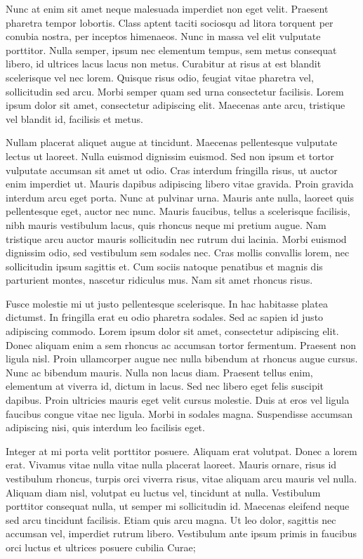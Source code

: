 Nunc at enim sit amet neque malesuada imperdiet non eget velit. Praesent
pharetra tempor lobortis. Class aptent taciti sociosqu ad litora torquent
per conubia nostra, per inceptos himenaeos. Nunc in massa vel elit
vulputate porttitor. Nulla semper, ipsum nec elementum tempus, sem
metus consequat libero, id ultrices lacus lacus non metus. Curabitur
at risus at est blandit scelerisque vel nec lorem. Quisque risus odio,
feugiat vitae pharetra vel, sollicitudin sed arcu. Morbi semper quam
sed urna consectetur facilisis. Lorem ipsum dolor sit amet, consectetur
adipiscing elit. Maecenas ante arcu, tristique vel blandit id, facilisis
et metus.

Nullam placerat aliquet augue at tincidunt. Maecenas pellentesque
vulputate lectus ut laoreet. Nulla euismod dignissim euismod. Sed
non ipsum et tortor vulputate accumsan sit amet ut odio. Cras interdum
fringilla risus, ut auctor enim imperdiet ut. Mauris dapibus adipiscing
libero vitae gravida. Proin gravida interdum arcu eget porta. Nunc
at pulvinar urna. Mauris ante nulla, laoreet quis pellentesque eget,
auctor nec nunc. Mauris faucibus, tellus a scelerisque facilisis,
nibh mauris vestibulum lacus, quis rhoncus neque mi pretium augue.
Nam tristique arcu auctor mauris sollicitudin nec rutrum dui lacinia.
Morbi euismod dignissim odio, sed vestibulum sem sodales nec. Cras
mollis convallis lorem, nec sollicitudin ipsum sagittis et. Cum sociis
natoque penatibus et magnis dis parturient montes, nascetur ridiculus
mus. Nam sit amet rhoncus risus.

Fusce molestie mi ut justo pellentesque scelerisque. In hac habitasse
platea dictumst. In fringilla erat eu odio pharetra sodales. Sed ac
sapien id justo adipiscing commodo. Lorem ipsum dolor sit amet, consectetur
adipiscing elit. Donec aliquam enim a sem rhoncus ac accumsan tortor
fermentum. Praesent non ligula nisl. Proin ullamcorper augue nec nulla
bibendum at rhoncus augue cursus. Nunc ac bibendum mauris. Nulla non
lacus diam. Praesent tellus enim, elementum at viverra id, dictum
in lacus. Sed nec libero eget felis suscipit dapibus. Proin ultricies
mauris eget velit cursus molestie. Duis at eros vel ligula faucibus
congue vitae nec ligula. Morbi in sodales magna. Suspendisse accumsan
adipiscing nisi, quis interdum leo facilisis eget.

Integer at mi porta velit porttitor posuere. Aliquam erat volutpat.
Donec a lorem erat. Vivamus vitae nulla vitae nulla placerat laoreet.
Mauris ornare, risus id vestibulum rhoncus, turpis orci viverra risus,
vitae aliquam arcu mauris vel nulla. Aliquam diam nisl, volutpat eu
luctus vel, tincidunt at nulla. Vestibulum porttitor consequat nulla,
ut semper mi sollicitudin id. Maecenas eleifend neque sed arcu tincidunt
facilisis. Etiam quis arcu magna. Ut leo dolor, sagittis nec accumsan
vel, imperdiet rutrum libero. Vestibulum ante ipsum primis in faucibus
orci luctus et ultrices posuere cubilia Curae;

